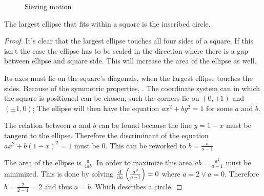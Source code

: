 \documentclass[11pt,fleqn,,a4paper,twoside,openright]{book}
\begin{document}
\begin{figure}[h]
	\label{fig:sievemotion}
	\centering
	\caption{Sieving motion}
\end{figure}

\begin{theorem}
	\label{theo:ellipcircle}
	The largest ellipse that fits within a square is the inscribed circle. 
	
	\begin{proof}
		It's clear that the largest ellipse touches all four sides of a square. If this isn't the case the ellipse has to be scaled in the direction where there is a gap between ellipse and square side. This will increase the area of the ellipse as well.
		
		Its axes must lie on the square's diagonals, when the largest ellipse touches the sides. Because of the symmetric properties, . The coordinate system can in which the square is positioned can be chosen, such the corners lie on $ (0,\pm1) $ and $ (\pm1, 0) $; The ellipse will then have the equation $ ax^2 + by^2 = 1 $ for some $ a $ and $ b $.
		
		The relation between $ a $ and $ b $ can be found because the line $ y = 1 - x $ must be tangent to the ellipse. Therefore the discriminant of the equation $ ax^2 + b(1 - x)^2 = 1 $ must be 0. This can be reworked to $ b = \frac{a}{a-1}$
		
		The area of the ellipse is $ \frac{\pi}{4ab} $. In order to maximize this area $ ab = \frac{a^2}{a - 1} $ must be minimized. This is done by solving $ \frac{\dif}{\dif a}\left(\frac{a^2}{a - 1}\right) = 0 $ where $ a = 2 \vee a = 0 $. Therefore $ b = \frac{2}{2 - 1} = 2 $ and thus $ a = b $. Which describes a circle.
	\end{proof}
	
\end{theorem}
\end{document}
